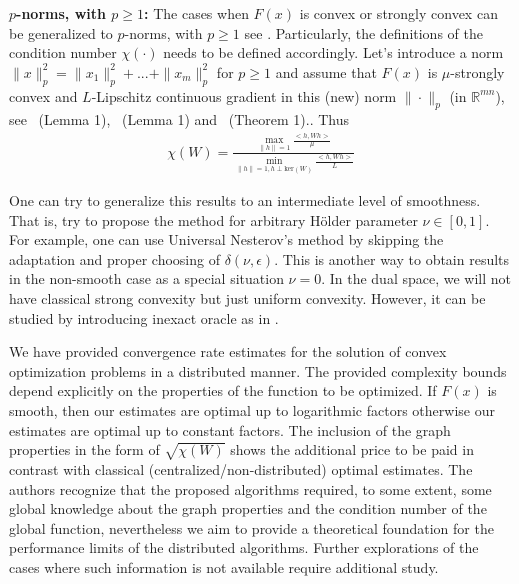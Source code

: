 \documentclass[final]{siamart1116}
\numberwithin{theorem}{section}
\begin{document}
\noindent\textbf{$p$-norms, with $p\geq 1$:} The cases when $F(x)$ is convex or strongly convex can be generalized to $p$-norms, with $p\geq 1$ see \cite{ani17}. Particularly, the definitions of the condition number $\chi(\cdot)$ needs to be defined accordingly. Let's introduce a norm \mbox{$\| x\|^2_p = \|x_1\|_p^2 + ... + \|x_m\|_p^2$} for \mbox{$p\geq 1$} and assume that $F(x)$ is $\mu$-strongly convex and $L$-Lipschitz continuous gradient in this (new) norm $\|\cdot \|_p$ (in $\mathbb{R}^{mn}$), see \cite{nes15}~(Lemma 1), \cite{dvu17b}~(Lemma 1) and \cite{nes05}~(Theorem 1).. Thus 
\begin{align*}
\chi(W) = \frac{\max_{\|h\|=1} \frac{<h,Wh>}{\mu}}{\min_{\|h\|=1, h \perp \text{ker}(W)} \frac{<h,Wh>}{L}}
\end{align*} 
	
	One can try to generalize this results to an intermediate level of smoothness. That is, try to propose the method for arbitrary H\"older parameter $\nu \in [0,1]$. For example, one can use Universal Nesterov's method by skipping the adaptation and proper choosing of $\delta(\nu,\epsilon)$. This is another way to obtain results in the non-smooth case as a special situation $\nu = 0$. In the dual space, we will not have classical strong convexity but just uniform convexity. However, it can be studied by introducing inexact oracle as in \cite{gas15}.
	
	\vspace{1em}
	
	We have provided convergence rate estimates for the solution of convex optimization problems in a distributed manner. The provided complexity bounds depend explicitly on the properties of the function to be optimized. If $F(x)$ is smooth, then our estimates are optimal up to logarithmic factors otherwise our estimates are optimal up to constant factors. The inclusion of the graph properties in the form of $\sqrt{\chi(W)}$ shows the additional price to be paid in contrast with classical (centralized/non-distributed) optimal estimates. The authors recognize that the proposed algorithms required, to some extent, some global knowledge about the graph properties and the condition number of the global function, nevertheless we aim to provide a theoretical foundation for the performance limits of the distributed algorithms. Further explorations of the cases where such information is not available require additional study.
	
	
	 
	
	
	
	
\end{document}
